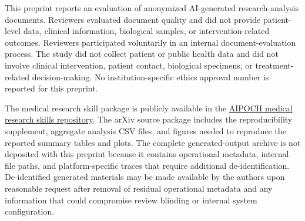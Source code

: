 \documentclass[11pt]{article}
\begin{document}
This preprint reports an evaluation of anonymized AI-generated research-analysis documents. Reviewers evaluated document quality and did not provide patient-level data, clinical information, biological samples, or intervention-related outcomes. Reviewers participated voluntarily in an internal document-evaluation process. The study did not collect patient or public health data and did not involve clinical intervention, patient contact, biological specimens, or treatment-related decision-making. No institution-specific ethics approval number is reported for this preprint.

The medical research skill package is publicly available in the \href{https://github.com/aipoch/medical-research-skills/tree/main/awesome-med-research-skills}{AIPOCH medical research skills repository}. The arXiv source package includes the reproducibility supplement, aggregate analysis CSV files, and figures needed to reproduce the reported summary tables and plots. The complete generated-output archive is not deposited with this preprint because it contains operational metadata, internal file paths, and platform-specific traces that require additional de-identification. De-identified generated materials may be made available by the authors upon reasonable request after removal of residual operational metadata and any information that could compromise review blinding or internal system configuration.
\end{document}
